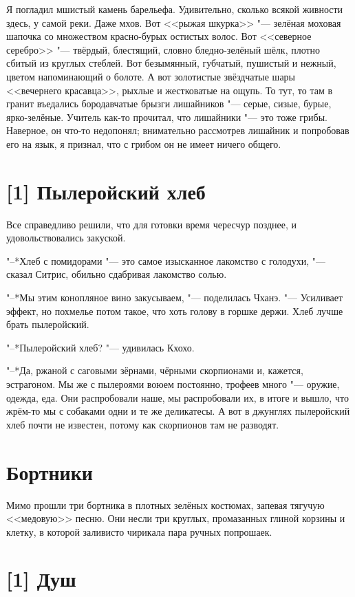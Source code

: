 Я погладил мшистый камень барельефа.
Удивительно, сколько всякой живности здесь, у самой реки.
Даже мхов.
Вот <<рыжая шкурка>> "--- зелёная моховая шапочка со множеством красно-бурых остистых волос.
Вот <<северное серебро>> "--- твёрдый, блестящий, словно бледно-зелёный шёлк, плотно сбитый из круглых стеблей.
Вот безымянный, губчатый, пушистый и нежный, цветом напоминающий о болоте.
А вот золотистые звёздчатые шары <<вечернего красавца>>, рыхлые и жестковатые на ощупь.
То тут, то там в гранит въедались бородавчатые брызги лишайников "--- серые, сизые, бурые, ярко-зелёные.
Учитель как-то прочитал, что лишайники "--- это тоже грибы.
Наверное, он что-то недопонял;
внимательно рассмотрев лишайник и попробовав его на язык, я признал, что с грибом он не имеет ничего общего.

\section{[1] Пылеройский хлеб}

Все справедливо решили, что для готовки время чересчур позднее, и удовольствовались закуской.

"--*Хлеб с помидорами "--- это самое изысканное лакомство с голодухи, "--- сказал Ситрис, обильно сдабривая лакомство солью.

"--*Мы этим конопляное вино закусываем, "--- поделилась Чханэ.
"--- Усиливает эффект, но похмелье потом такое, что хоть голову в горшке держи.
Хлеб лучше брать пылеройский.

"--*Пылеройский хлеб? "--- удивилась Кхохо.

"--*Да, ржаной с саговыми зёрнами, чёрными скорпионами и, кажется, эстрагоном.
Мы же с пылероями воюем постоянно, трофеев много "--- оружие, одежда, еда.
Они распробовали наше, мы распробовали их, в итоге и вышло, что жрём-то мы с собаками одни и те же деликатесы.
А вот в джунглях пылеройский хлеб почти не известен, потому как скорпионов там не разводят.

\section{Бортники}

Мимо прошли три бортника в плотных зелёных костюмах, запевая тягучую <<медовую>> песню.
Они несли три круглых, промазанных глиной корзины и клетку, в которой заливисто чирикала пара ручных попрошаек.

\section{[1] Душ}


